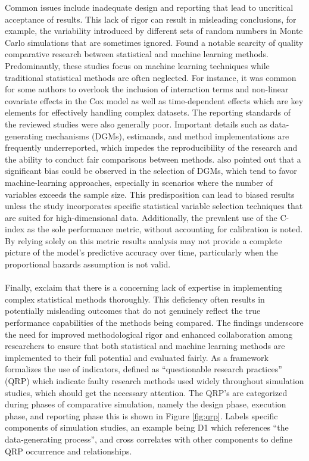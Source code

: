 Common issues include inadequate design and reporting that lead to uncritical acceptance of results. This lack of rigor can result in misleading conclusions, for example, the variability introduced by different sets of random numbers in Monte Carlo simulations that are sometimes ignored. \parencite{smith_scoping_2022} Found a notable scarcity of quality comparative research between statistical and machine learning methods. Predominantly, these studies focus on machine learning techniques while traditional statistical methods are often neglected. For instance, it was common for some authors to overlook the inclusion of interaction terms and non-linear covariate effects in the Cox model as well as time-dependent effects which are key elements for effectively handling complex datasets. The reporting standards of the reviewed studies were also generally poor. Important details such as data-generating mechanisms (DGMs), estimands, and method implementations are frequently underreported, which impedes the reproducibility of the research and the ability to conduct fair comparisons between methods. \parencite{smith_scoping_2022} also pointed out that a significant bias could be observed in the selection of DGMs, which tend to favor machine-learning approaches, especially in scenarios where the number of variables exceeds the sample size. This predisposition can lead to biased results unless the study incorporates specific statistical variable selection techniques that are suited for high-dimensional data. Additionally, the prevalent use of the C-index as the sole performance metric, without accounting for calibration is noted. By relying solely on this metric results analysis may not provide a complete picture of the model's predictive accuracy over time, particularly when the proportional hazards assumption is not valid.
\\\\
Finally, \parencite{smith_scoping_2022} exclaim that there is a concerning lack of expertise in implementing complex statistical methods thoroughly. This deficiency often results in potentially misleading outcomes that do not genuinely reflect the true performance capabilities of the methods being compared. The findings underscore the need for improved methodological rigor and enhanced collaboration among researchers to ensure that both statistical and machine learning methods are implemented to their full potential and evaluated fairly. As a framework \parencite{pawel_pitfalls_2024} formalizes the use of indicators, defined as “questionable research practices” (QRP) which indicate faulty research methods used widely throughout simulation studies, which should get the necessary attention. The QRP's are categorized during phases of comparative simulation, namely the design phase, execution phase, and reporting phase this is shown in Figure \ref{fig:qrp}. \parencite{pawel_pitfalls_2024} Labels specific components of simulation studies, an example being D1 which references “the data-generating process”, and cross correlates with other components to define QRP occurrence and relationships.




